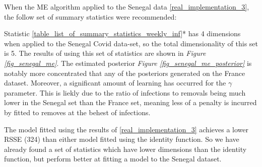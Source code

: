 \documentclass[11pt,a4paper]{article}
\theoremstyle{break}
\begin{document}
  \par When the ME algorithm applied to the Senegal data \ref{real_implementation_3}, the follow set of summary statistics were recommended:

  \begin{center}
  \end{center}

  \noindent Statistic \ref{table_list_of_summary_statistics_weekly_inf}* has 4 dimensions when applied to the Senegal Covid data-set, so the total dimensionality of this set is 5. The results of using this set of statistics are shown in \textit{Figure \ref{fig_senegal_me}}. The estimated posterior \textit{Figure \ref{fig_senegal_me_posterior}} is notably more concentrated that any of the posteriors generated on the France dataset. Moreover, a significant amount of learning has occurred for the $\gamma$ parameter. This is liekly due to the ratio of infections to removals being much lower in the Senegal set than the France set, meaning less of a penalty is incurred by fitted to removes at the behest of infections.

  \par The model fitted using the results of \ref{real_implementation_3} achieves a lower RSSE (324) than either model fitted using the identity function. So we have already found a set of statistics which have lower dimensions than the identity function, but perform better at fitting a model to the Senegal dataset.
\end{document}
